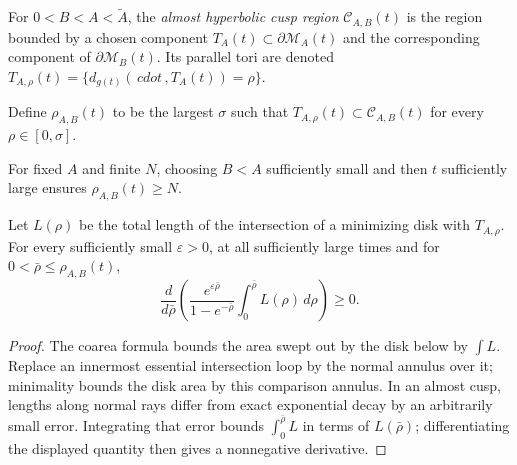 \begin{definition}
\label{def:chow-iv-almost-hyperbolic-cusp-region}
For \(0<B<A<\widetilde A\), the \emph{almost hyperbolic cusp region}
\(\mathcal C_{A,B}(t)\) is the region bounded by a chosen component
\(T_A(t)\subset\partial\mathcal M_A(t)\) and the corresponding component of
\(\partial\mathcal M_B(t)\).  Its parallel tori are denoted
\(T_{A,\rho}(t)=\{d_{g(t)}(\,cdot\,,T_A(t))=\rho\}\).
\end{definition}

\begin{definition}
\label{def:chow-iv-almost-cusp-depth}
Define \(\rho_{A,B}(t)\) to be the largest \(\sigma\) such that
\(T_{A,\rho}(t)\subset\mathcal C_{A,B}(t)\) for every
\(\rho\in[0,\sigma]\).
\end{definition}

\begin{remark}
\label{rem:chow-iv-almost-cusps-arbitrary-depth}
For fixed \(A\) and finite \(N\), choosing \(B<A\) sufficiently small and then
\(t\) sufficiently large ensures \(\rho_{A,B}(t)\ge N\).
\end{remark}

\begin{lemma}
\label{lem:chow-iv-cusp-length-monotonicity}
Let \(L(\rho)\) be the total length of the intersection of a minimizing disk
with \(T_{A,\rho}\).  For every sufficiently small \(\varepsilon>0\), at all
sufficiently large times and for \(0<\bar\rho\le\rho_{A,B}(t)\),
\[
 \frac d{d\bar\rho}\left(
 \frac{e^{\varepsilon\bar\rho}}{1-e^{-\bar\rho}}
 \int_0^{\bar\rho}L(\rho)\,d\rho\right)\ge0.
\]
\end{lemma}

\begin{proof}
The coarea formula bounds the area swept out by the disk below by
\(\int L\).  Replace an innermost essential intersection loop by the normal
annulus over it; minimality bounds the disk area by this comparison annulus.
In an almost cusp, lengths along normal rays differ from exact exponential
decay by an arbitrarily small error.  Integrating that error bounds
\(\int_0^{\bar\rho}L\) in terms of \(L(\bar\rho)\); differentiating the displayed
quantity then gives a nonnegative derivative.
\end{proof}

